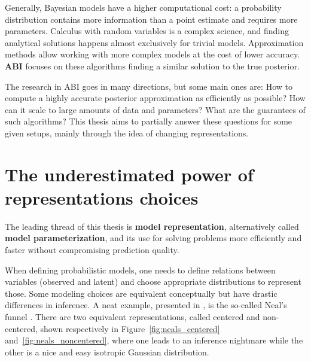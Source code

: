 Generally, Bayesian models have a higher computational cost: a probability distribution contains more information than a point estimate and requires more parameters.
Calculus with random variables is a complex science, and finding analytical solutions happens almost exclusively for trivial models.
Approximation methods allow working with more complex models at the cost of lower accuracy. 
\textbf{\ac{ABI}} focuses on these algorithms finding a similar solution to the true posterior.

The research in \ac{ABI} goes in many directions, but some main ones are: How to compute a highly accurate posterior approximation as efficiently as possible? How can it scale to large amounts of data and parameters? What are the guarantees of such algorithms?
This thesis aims to partially answer these questions for some given setups, mainly through the idea of changing representations.

\section{The underestimated power of representations choices}

The leading thread of this thesis is \textbf{model representation}, alternatively called \textbf{model parameterization}, and its use for solving problems more efficiently and faster without compromising prediction quality.

When defining probabilistic models, one needs to define relations between variables (observed and latent) and choose appropriate distributions to represent those.
Some modeling choices are equivalent conceptually but have drastic differences in inference.
A neat example, presented in \citet{gorinovaAutomaticReparameterisationProbabilistic2020}, is the so-called Neal's funnel \cite{nealSliceSampling2003}.
There are two equivalent representations, called centered and non-centered, shown respectively in Figure~\ref{fig:neals_centered} and~\ref{fig:neals_noncentered}, where one leads to an inference nightmare while the other is a nice and easy isotropic Gaussian distribution.

